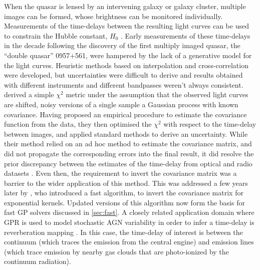 \documentclass[letterpaper]{ar-1col}
\begin{document}
When the quasar is lensed by an intervening galaxy or galaxy cluster, multiple images can be formed, whose brightness can be monitored individually.
Measurements of the time-delays between the resulting light curves can be used to constrain the Hubble constant, $H_0$ \citep{doi:10.1146/annurev.aa.30.090192.001523}.
Early measurements of these time-delays in the decade following the discovery of the first multiply imaged quasar, the ``double quasar'' 0957$+$561, were hampered by the lack of a generative model for the light curves.
Heuristic methods based on interpolation and cross-correlation were developed, but uncertainties were difficult to derive and results obtained with different instruments and different bandpasses weren't always consistent.
\citet{prh92a} derived a simple $\chi^2$ metric under the assumption that the observed light curves are shifted, noisy versions of a single sample a Gaussian process with known covariance.
Having proposed an empirical procedure to estimate the covariance function from the data, they then optimised the $\chi^2$ with respect to the time-delay between images, and applied standard methods to derive an uncertainty.
While their method relied on an ad hoc method to estimate the covariance matrix, and did not propagate the corresponding errors into the final result, it did resolve the prior discrepancy between the estimates of the time-delay from optical and radio datasets \citep{prh92b}.
Even then, the requirement to invert the covariance matrix was a barrier to the wider application of this method.
This was addressed a few years later by \citet{pr95}, who introduced a fast algorithm, to invert the covariance matrix for exponential kernels.
Updated versions of this algorithm now form the basis for fast GP solvers discussed in \autoref{sec:fast}. A closely related application domain where GPR is used to model stochastic AGN variability in order to infer a time-delay is reverberation mapping \citep[see e.g.][]{2011ApJ...735...80Z}. In this case, the time-delay of interest is between the continuum (which traces the emission from the central engine) and emission lines (which trace emission by nearby gas clouds that are photo-ionized by the continuum radiation). 
\end{document}
